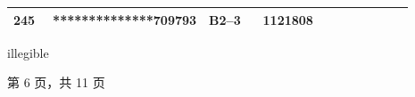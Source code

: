 \documentclass[UTF8,10pt,a4paper,fontset=fandol]{ctexart}
\newcommand{\fieldvalue}[1]{#1}
\newcommand{\handwritten}[1]{#1}
\begin{document}
\begin{center}
\begin{tabular}{|p{0.10\linewidth}|p{0.25\linewidth}|p{0.14\linewidth}|p{0.24\linewidth}|p{0.16\linewidth}|}
\fieldvalue{245} &
\fieldvalue{**************709793} &
\fieldvalue{B2--3} &
\fieldvalue{1121808} & \\ \hline
\end{tabular}
\end{center}

\handwritten{illegible}

\begin{center}
第 6 页，共 11 页
\end{center}

\newpage
\end{document}
